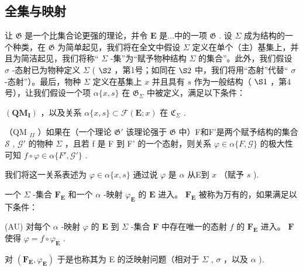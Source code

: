 \subsection{全集与映射}

让 \(\mathfrak{G}\) 是一个比集合论更强的理论，并令 \(\mathbf{E}\) 是...中的一项 \(\mathfrak{G}\) . 设 \(\Sigma\) 成为结构的一个种类，在 \(\mathfrak{G}\) 为简单起见，我们将在全文中假设 \(\Sigma\) 定义在单个（主）基集上，并且为简洁起见，我们将称“ \(\Sigma\) -集”为“赋予物种结构 \(\Sigma\) 的集合”。此外，我们假设 \(\sigma\) -态射已为物种定义 \(\Sigma\) ( \(\S 2\) ，第1号；如同在 \(\S 2\) 中，我们将用“态射”代替“ \(\sigma\) -态射”）。最后，物种 \(\Sigma\) 定义在基集上 \(x\) 并且具有 \(s\) 作为一般结构（ \(\S 1\) ，第4号），让我们假设一个项 \(\alpha \{x, s\}\) 在 \(\mathfrak{G}_{\Sigma}\) 中被定义，满足以下条件：

\((\mathbf{Q}\mathbf{M}_{\mathbf{I}})\) ，以及关系 \(\alpha \{x,s\} \subset \mathcal{F}(\mathbf{E};x)\) 在 \(\mathfrak{C}_{\Sigma}\) .

（QM \(_{II}\) ）如果在（一个理论 \(\mathfrak{G}'\) 该理论强于 \(\mathfrak{G}\) 中）F和F'是两个赋予结构的集合 \(\mathscr{S}\) , \(\mathscr{G}'\) 的物种 \(\Sigma\) ，且若 f 是 F 到 F' 的一个态射，则关系 \(\varphi \in \alpha \{F, \mathscr{G}\}\) 的极大性可知 \(f \circ \varphi \in \alpha \{F', \mathscr{G}'\}\) .

我们将这一关系表述为 \(\varphi\in\alpha\{x,s\}\) 通过说 \(\varphi\) 是 \(\alpha\) 从E到 \(x\) （赋予 \(s\) ).

一个 \(\Sigma\) -集合 \(\mathbf{F}_{\mathbf{E}}\) 和一个 \(\alpha\) -映射 \(\varphi_{\mathbf{E}}\) 的 \(\mathbf{E}\) 进入。 \(\mathbf{F}_{\mathbf{E}}\) 被称为万有的，如果满足以下条件：

(AU) 对每个 \(\alpha\) -映射 \(\varphi\) 的 \(\mathbf{E}\) 到 \(\Sigma\) -集合 \(\mathbf{F}\) 中存在唯一的态射 \(f\) 的 \(\mathbf{F}_{\mathbf{E}}\) 进入。 \(\mathbf{F}\) 使得 \(\varphi = f \circ \varphi_{\mathbf{E}}\) .

对 \((\mathbf{F}_{\mathbf{E}}, \varphi_{\mathbf{E}})\) 于是也称其为 E 的泛映射问题（相对于 \(\Sigma\) , \(\sigma\) ，以及 \(\alpha\) ).

